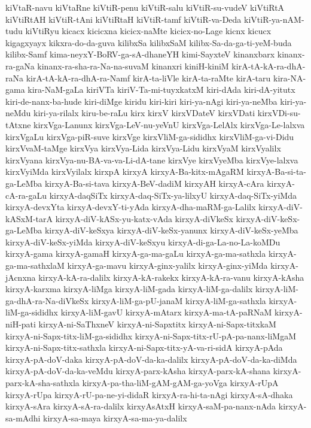 {kiVtaR-navu
kiVtaRne
kiVtiR-penu
kiVtiR-salu
kiVtiR-su-vudeV
kiVtiRtA
kiVtiRtAH
kiVtiR-tAni
kiVtiRtaH
kiVtiR-tamf
kiVtiR-va-Deda
kiVtiR-ya-nAM-tudu
kiVtiRyu
kicacx
kicicxna
kicicx-naMte
kicicx-no-Lage
kicnx
kicucx
kigagxyayx
kikxra-do-da-guva
kilibxSa
kilibxSaM
kilibx-Sa-da-ga-ti-yeM-buda
kilibx-Samf
kima-neyxY-BoRV-ga-sA-dhaneYH
kimi-SayxteV
kinanxbarx
kinanx-ra-gaNa
kinanx-ra-sha-ra-Na-na-suvaM
kinanxri
kiniH-kiniM
kirA-tA-kA-ra-dhA-raNa
kirA-tA-kA-ra-dhA-ra-Namf
kirA-ta-liVle
kirA-ta-raMte
kirA-taru
kira-NA-gama
kira-NaM-gaLa
kiriVTa
kiriV-Ta-mi-tuyxkatxM
kiri-dAda
kiri-dA-yitutx
kiri-de-nanx-ba-hude
kiri-diMge
kiridu
kiri-kiri
kiri-ya-nAgi
kiri-ya-neMba
kiri-ya-neMdu
kiri-ya-rilalx
kiru-be-raLu
kirx
kirxV
kirxVDateV
kirxVDati
kirxVDi-su-tAtxne
kirxVga-Lanunx
kirxVga-LeV-nu-yeVnU
kirxVga-LelAlx
kirxVga-Le-lalxva
kirxVgaLu
kirxVga-piR-suve
kirxVge
kirxVliM-ga-sididhx
kirxVliM-ga-vi-Didu
kirxVvaM-taMge
kirxVya
kirxVya-Lida
kirxVya-Lidu
kirxVyaM
kirxVyalilx
kirxVyana
kirxVya-nu-BA-va-va-Li-dA-tane
kirxVye
kirxVyeMba
kirxVye-lalxva
kirxVyiMda
kirxVyilalx
kirxpA
kirxyA
kirxyA-Ba-kitx-mAgaRM
kirxyA-Ba-si-ta-ga-LeMba
kirxyA-Ba-si-tava
kirxyA-BeV-dadiM
kirxyAH
kirxyA-cAra
kirxyA-cA-ra-gaLu
kirxyA-daqSiTx
kirxyA-daq-SiTx-ya-lilxyU
kirxyA-daq-SiTx-yiMda
kirxyA-devxYta
kirxyA-devxY-ti-yAda
kirxyA-dha-maRM-ga-Lalilx
kirxyA-diV-kASxM-tarA
kirxyA-diV-kASx-yu-katx-vAda
kirxyA-diVkeSx
kirxyA-diV-keSx-ga-LeMba
kirxyA-diV-keSxya
kirxyA-diV-keSx-yanunx
kirxyA-diV-keSx-yeMba
kirxyA-diV-keSx-yiMda
kirxyA-diV-keSxyu
kirxyA-di-ga-La-no-La-koMDu
kirxyA-gama
kirxyA-gamaH
kirxyA-ga-ma-gaLu
kirxyA-ga-ma-sathxla
kirxyA-ga-ma-sathxlaM
kirxyA-ga-mavu
kirxyA-ginx-yalilx
kirxyA-ginx-yiMda
kirxyA-jAcnxna
kirxyA-kA-ra-dalilx
kirxyA-kA-rakekx
kirxyA-kA-ra-vanu
kirxyA-kAsha
kirxyA-karxma
kirxyA-liMga
kirxyA-liM-gada
kirxyA-liM-ga-dalilx
kirxyA-liM-ga-dhA-ra-Na-diVkeSx
kirxyA-liM-ga-pU-janaM
kirxyA-liM-ga-sathxla
kirxyA-liM-ga-sididhx
kirxyA-liM-gavU
kirxyA-mAtarx
kirxyA-ma-tA-paRNaM
kirxyA-niH-pati
kirxyA-ni-SaThxneV
kirxyA-ni-Sapxtitx
kirxyA-ni-Sapx-titxkaM
kirxyA-ni-Sapx-titx-liM-ga-sididhx
kirxyA-ni-Sapx-titx-rU-pA-pa-nanx-liMgaM
kirxyA-ni-Sapx-titx-sathxla
kirxyA-ni-Sapx-titx-yA-va-ri-sidA
kirxyA-pAda
kirxyA-pA-doV-daka
kirxyA-pA-doV-da-ka-dalilx
kirxyA-pA-doV-da-ka-diMda
kirxyA-pA-doV-da-ka-veMdu
kirxyA-parx-kAsha
kirxyA-parx-kA-shana
kirxyA-parx-kA-sha-sathxla
kirxyA-pa-tha-liM-gAM-gAM-ga-yoVga
kirxyA-rUpA
kirxyA-rUpa
kirxyA-rU-pa-ne-yi-didaR
kirxyA-ra-hi-ta-nAgi
kirxyA-sA-dhaka
kirxyA-sAra
kirxyA-sA-ra-dalilx
kirxyAsAtxH
kirxyA-saM-pa-nanx-nAda
kirxyA-sa-mAdhi
kirxyA-sa-maya
kirxyA-sa-ma-ya-dalilx
}
